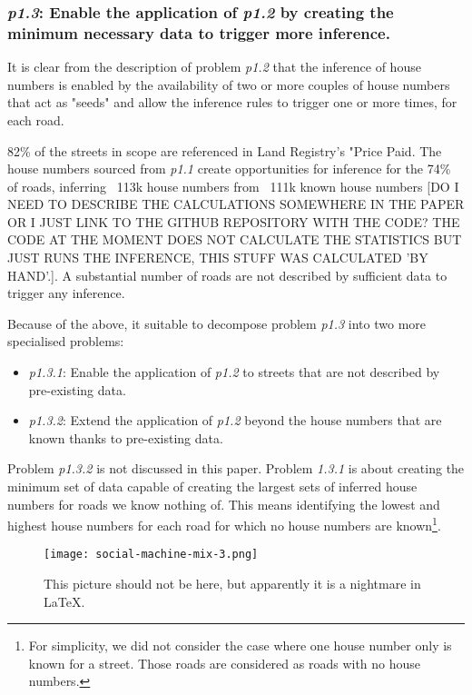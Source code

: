     \subsubsection{{\it p1.3}: Enable the application of {\it p1.2} by creating the minimum necessary data to trigger more inference.} 

        It is clear from the description of problem {\it p1.2} that the inference of house numbers is enabled by the availability of two or more couples of house numbers that act as "seeds" and allow the inference rules to trigger one or more times, for each road.
        
        82\% of the streets in scope are referenced in Land Registry's "Price Paid. The house numbers sourced from {\it p1.1} create opportunities for inference for the 74\% of roads, inferring ~113k house numbers from ~111k known house numbers [DO I NEED TO DESCRIBE THE CALCULATIONS SOMEWHERE IN THE PAPER OR I JUST LINK TO THE GITHUB REPOSITORY WITH THE CODE? THE CODE AT THE MOMENT DOES NOT CALCULATE THE STATISTICS BUT JUST RUNS THE INFERENCE, THIS STUFF WAS CALCULATED 'BY HAND'.]. A substantial number of roads are not described by sufficient data to trigger any inference. 
        
        Because of the above, it suitable to decompose problem {\it p1.3} into two more specialised problems:
        
        \begin{itemize}
            \item {\it p1.3.1}: Enable the application of {\it p1.2} to streets that are not described by pre-existing data.
            \item {\it p1.3.2}: Extend the application of {\it p1.2} beyond the house numbers that are known thanks to pre-existing data.
        \end{itemize}
        
        Problem {\it p1.3.2} is not discussed in this paper. Problem {\it 1.3.1} is about creating the minimum set of data capable of creating the largest sets of inferred house numbers for roads we know nothing of. This means identifying the lowest and highest house numbers for each road for which no house numbers are known\footnote{For simplicity, we did not consider the case where one house number only is known for a street. Those roads are considered as roads with no house numbers.}.

        \begin{figure*}
        	\texttt{[image: social-machine-mix-3.png]}
        	\caption{This picture should not be here, but apparently it is a nightmare in LaTeX.}
        	\label{fig:social_machine_mix_3}
        \end{figure*}
        
